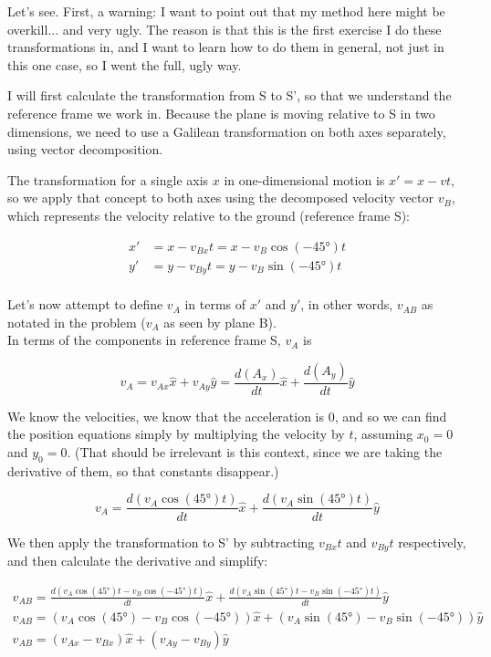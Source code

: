\documentclass[12pt,a4paper]{report}
\begin{document}
Let's see. First, a warning: I want to point out that my method here might be overkill... and very ugly. The reason is that this is the first exercise I do these transformations in, and I want to learn how to do them in general, not just in this one case, so I went the full, ugly way.

I will first calculate the transformation from S to S', so that we understand the reference frame we work in. Because the plane is moving relative to S in two dimensions, we need to use a Galilean transformation on both axes separately, using vector decomposition.

The transformation for a single axis $x$ in one-dimensional motion is $x' = x - v t$, so we apply that concept to both axes using the decomposed velocity vector $v_B$, which represents the velocity relative to the ground (reference frame S):

\begin{align}
x' &= x - v_{Bx} t = x - v_B \cos(-\ang{45}) t\\
y' &= y - v_{By} t = y - v_B \sin(-\ang{45}) t\\
\end{align}
	
Let's now attempt to define $v_A$ in terms of $x'$ and $y'$, in other words, $v_{AB}$ as notated in the problem ($v_A$ as seen by plane B).\\
In terms of the components in reference frame S, $v_A$ is

\begin{equation}
v_A = v_{Ax} \hat{x} + v_{Ay} \hat{y} = \frac{d(A_x)}{dt} \hat{x} + \frac{d(A_y)}{dt} \hat{y}
\end{equation}

We know the velocities, we know that the acceleration is 0, and so we can find the position equations simply by multiplying the velocity by $t$, assuming $x_0 = 0$ and $y_0 = 0$. (That should be irrelevant is this context, since we are taking the derivative of them, so that constants disappear.)

\begin{equation}
v_A = \frac{d(v_A \cos(\ang{45}) t)}{dt} \hat{x} + \frac{d(v_A \sin(\ang{45}) t)}{dt} \hat{y}
\end{equation}

We then apply the transformation to S' by subtracting $v_{Bx} t$ and $v_{By} t$ respectively, and then calculate the derivative and simplify:

\begin{align}
v_{AB} = \frac{d(v_A \cos(\ang{45}) t - v_B \cos(-\ang{45}) t)}{dt} \hat{x} + \frac{d(v_A \sin(\ang{45}) t - v_B \sin(-\ang{45}) t)}{dt} \hat{y}\\
v_{AB} = (v_A \cos(\ang{45}) - v_B \cos(-\ang{45})) \hat{x} + (v_A \sin(\ang{45}) - v_B \sin(-\ang{45})) \hat{y}\\
v_{AB} = (v_{Ax} - v_{Bx}) \hat{x} + (v_{Ay} - v_{By}) \hat{y}
\end{align}
\end{document}
